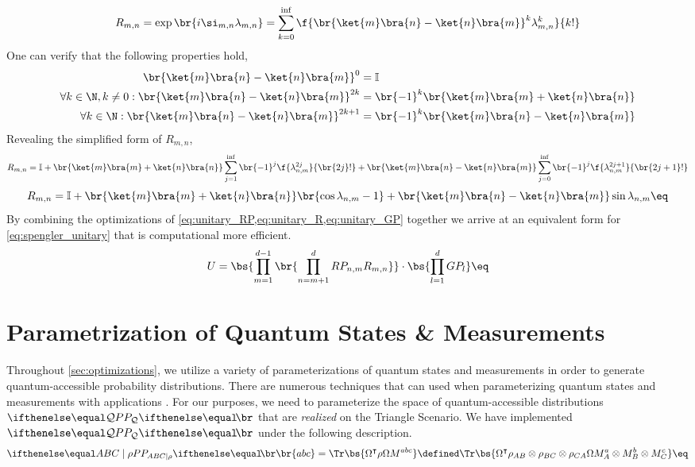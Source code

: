 \documentclass[aps, 10pt, english, twoside, pra, nofootinbib, longbibliography]{revtex4-1}
\theoremstyle{plain}
\theoremstyle{definition}
\theoremstyle{remark}
\begin{document}
    \[ R_{m,n} = \exp\br{i \si_{m,n} \lambda_{m,n}} = \sum_{k=0}^{\inf} \f{\br{\ket{m}\bra{n} - \ket{n}\bra{m}}^k \lambda_{m,n}^k}{k!} \]
    One can verify that the following properties hold,
    \begin{align*}
        \br{\ket{m}\bra{n} - \ket{n}\bra{m}}^0 &= \mathbb{I} \\
        \forall k \in \N, k \neq 0 : \br{\ket{m}\bra{n} - \ket{n}\bra{m}}^{2k} &= \br{-1}^k\br{\ket{m}\bra{m} + \ket{n}\bra{n}} \\
        \forall k \in \N : \br{\ket{m}\bra{n} - \ket{n}\bra{m}}^{2k+1} &= \br{-1}^k\br{\ket{m}\bra{n} - \ket{n}\bra{m}}
    \end{align*}
    Revealing the simplified form of $R_{m,n}$,
    \[ R_{m,n} = \mathbb{I} + \br{\ket{m}\bra{m} + \ket{n}\bra{n}} \sum_{j=1}^{\inf} \br{-1}^j\f{\lambda_{n,m}^{2j}}{\br{2j}!} + \br{\ket{m}\bra{n} - \ket{n}\bra{m}} \sum_{j=0}^{\inf} \br{-1}^j\f{\lambda_{n,m}^{2j+1}}{\br{2j+1}!} \]
    \[ R_{m,n} = \mathbb{I} + \br{\ket{m}\bra{m} + \ket{n}\bra{n}} \br{\cos\lambda_{n,m} - 1} + \br{\ket{m}\bra{n} - \ket{n}\bra{m}} \sin\lambda_{n,m} \eq \label{eq:unitary_R} \]
    By combining the optimizations of \cref{eq:unitary_RP,eq:unitary_R,eq:unitary_GP} together we arrive at an equivalent form for \cref{eq:spengler_unitary} that is computational more efficient.
    \[ U = \bs{\prod_{m=1}^{d-1} \br{\prod_{n=m+1}^{d} RP_{n,m}R_{m,n}}} \cdot \bs{\prod_{l=1}^{d} GP_l} \eq \label{eq:fast_spengler_unitary} \]

    \section{Parametrization of Quantum States \& Measurements}
    Throughout \cref{sec:optimizations}, we utilize a variety of parameterizations of quantum states and measurements in order to generate quantum-accessible probability distributions. There are numerous techniques that can used when parameterizing quantum states and measurements \cite{Petz_2015, Hedemann_2013,Spengler_2010_Unitary,Fujii_2005,James_2001} with applications . For our purposes, we need to parameterize the space of quantum-accessible distributions $\prob[\mathcal{Q}]$ that are \textit{realized} on the Triangle Scenario. We have implemented $\prob[\mathcal{Q}]$ under the following description.
    \[ \prob[ABC\mid \rho]\br{abc} = \Tr\bs{\Omega^\intercal \rho \Omega M^{abc}} \defined \Tr\bs{\Omega^\intercal \rho_{AB}\otimes\rho_{BC}\otimes\rho_{CA} \Omega M^a_{A}\otimes M^b_{B} \otimes M^c_{C}} \eq \label{eq:triangle_quantum_distributions} \]
\end{document}
